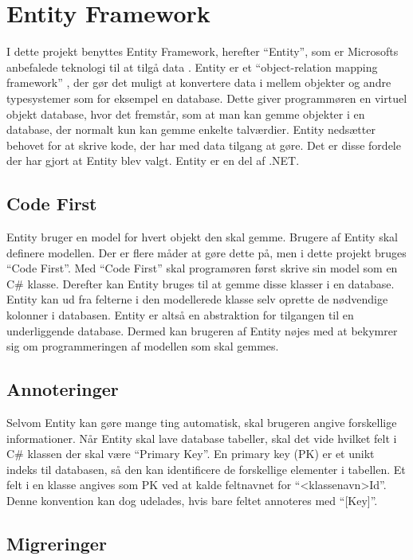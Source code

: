 \section{Entity Framework}
\label{sec:database}
I dette projekt benyttes Entity Framework, herefter \enquote{Entity}, som er Microsofts anbefalede teknologi til at tilgå data \cite{entity}. Entity er et \enquote{object-relation mapping framework} \cite{lerman2010programming}, der gør det muligt at konvertere data i mellem objekter og andre typesystemer som for eksempel en database. Dette giver programmøren en virtuel objekt database, hvor det fremstår, som at man kan gemme objekter i en database, der normalt kun kan gemme enkelte talværdier. Entity nedsætter behovet for at skrive kode, der har med data tilgang at gøre. Det er disse fordele der har gjort at Entity blev valgt. Entity er en del af .NET.


\subsection{Code First}
\label{sub:code_first}
Entity bruger en model for hvert objekt den skal gemme. Brugere af Entity skal definere modellen. Der er flere måder at gøre dette på, men i dette projekt bruges \enquote{Code First}. Med \enquote{Code First} skal programøren først skrive sin model som en C\# klasse. Derefter kan Entity bruges til at gemme disse klasser i en database. Entity kan ud fra felterne i den modellerede klasse selv oprette de nødvendige kolonner i databasen. Entity er altså en abstraktion for tilgangen til en underliggende database. Dermed kan brugeren af Entity nøjes med at bekymrer sig om programmeringen af modellen som skal gemmes.

\subsection{Annoteringer}
\label{sub:annoteringer}
Selvom Entity kan gøre mange ting automatisk, skal brugeren angive forskellige informationer. Når Entity skal lave database tabeller, skal det vide hvilket felt i C\# klassen der skal være \enquote{Primary Key}. En primary key (PK) er et unikt indeks til databasen, så den kan identificere de forskellige elementer i tabellen. Et felt i en klasse angives som PK ved at kalde feltnavnet for \enquote{<klassenavn>Id}. Denne konvention kan dog udelades, hvis bare feltet annoteres med \enquote{[Key]}.

\subsection{Migreringer}
\label{sub:migreringer}

